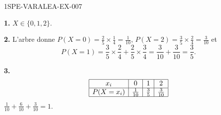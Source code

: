 \begin{corrige}{1SPE-VARALEA-EX-007}

\textbf{1.} $X \in \{0, 1, 2\}$.

\medskip
\textbf{2.} L'arbre donne
$P(X=0)=\frac25\times\frac14=\frac1{10}$,
$P(X=2)=\frac35\times\frac24=\frac3{10}$ et
\[
P(X=1)=\frac35\times\frac24+\frac25\times\frac34
=\frac3{10}+\frac3{10}=\frac35.
\]

\medskip
\textbf{3.}
\[
\begin{array}{|c|c|c|c|}
\hline
x_i & 0 & 1 & 2 \\
\hline
P(X=x_i) & \frac{1}{10} & \frac{3}{5} & \frac{3}{10} \\
\hline
\end{array}
\]
$\frac{1}{10}+\frac{6}{10}+\frac{3}{10}=1$. \checkmark

\end{corrige}
